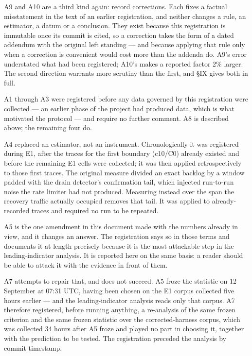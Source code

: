 \documentclass{ieeeaccess}
\begin{document}
A9 and A10 are a third kind again: record corrections. Each fixes a factual misstatement in the text of an earlier registration, and neither changes a rule, an estimator, a datum or a conclusion. They exist because this registration is immutable once its commit is cited, so a correction takes the form of a dated addendum with the original left standing --- and because applying that rule only when a correction is convenient would cost more than the addenda do. A9's error understated what had been registered; A10's makes a reported factor 2\% larger. The second direction warrants more scrutiny than the first, and \S{}IX gives both in full.

A1 through A3 were registered before any data governed by this registration were collected --- an earlier phase of the project had produced data, which is what motivated the protocol --- and require no further comment. A8 is described above; the remaining four do.

A4 replaced an estimator, not an instrument. Chronologically it was registered during E1, after the traces for the first boundary (c10/C0) already existed and before the remaining E1 cells were collected; it was then applied retrospectively to those first traces. The original measure divided an exact backlog by a window padded with the drain detector's confirmation tail, which injected run-to-run noise the rate limiter had not produced. Measuring instead over the span the recovery traffic actually occupied removes that tail. It was applied to already-recorded traces and required no run to be repeated.

A5 is the one amendment in this document made with the numbers already in view, and it changes an answer. The registration says so in those terms and documents it at length precisely because it is the most attackable step in the leading-indicator analysis. It is reported here on the same basis: a reader should be able to attack it with the evidence in front of them.

A7 attempts to repair that, and does not succeed. A5 froze the statistic on 12 September at 07:31 UTC, having been chosen on the E1 corpus collected five hours earlier --- and the leading-indicator analysis reads only that corpus. A7 therefore registered, before running anything, a re-analysis of the same frozen criterion and the same frozen statistic over the corrected-harness corpus, which was collected 34 hours after A5 froze and played no part in choosing it, together with the prediction to be tested. The registration preceded the analysis by commit timestamp.
\end{document}
